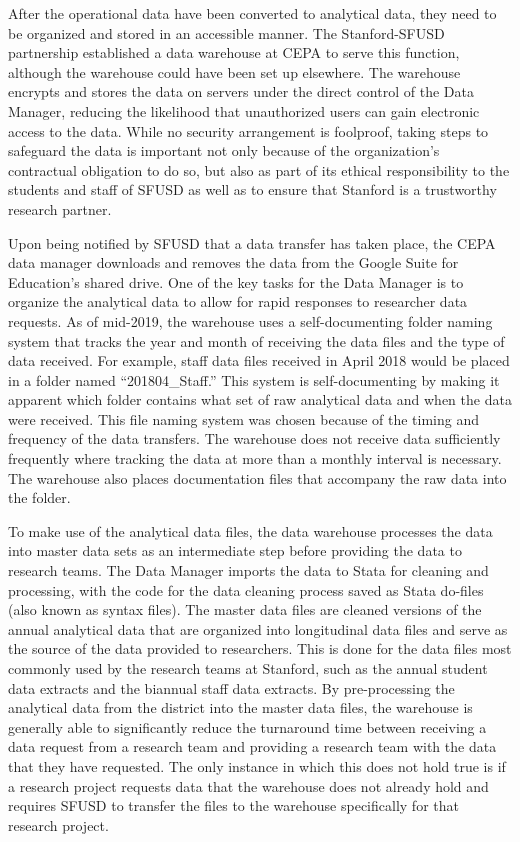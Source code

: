 After the operational data have been converted to analytical data, they need to be organized and stored in an accessible manner. The Stanford-SFUSD partnership established a data warehouse at CEPA to serve this function, although the warehouse could have been set up elsewhere. The warehouse encrypts and stores the data on servers under the direct control of the Data Manager, reducing the likelihood that unauthorized users can gain electronic access to the data. While no security arrangement is foolproof, taking steps to safeguard the data is important not only because of the organization's contractual obligation to do so, but also as part of its ethical responsibility to the students and staff of SFUSD as well as to ensure that Stanford is a trustworthy research partner.

Upon being notified by SFUSD that a data transfer has taken place, the CEPA data manager downloads and removes the data from the Google Suite for Education's shared drive. One of the key tasks for the Data Manager is to organize the analytical data to allow for rapid responses to researcher data requests. As of mid-2019, the warehouse uses a self-documenting folder naming system that tracks the year and month of receiving the data files and the type of data received. For example, staff data files received in April 2018 would be placed in a folder named ``201804\_Staff.'' This system is self-documenting by making it apparent which folder contains what set of raw analytical data and when the data were received. This file naming system was chosen because of the timing and frequency of the data transfers. The warehouse does not receive data sufficiently frequently where tracking the data at more than a monthly interval is necessary. The warehouse also places documentation files that accompany the raw data into the folder.

To make use of the analytical data files, the data warehouse processes the data into master data sets as an intermediate step before providing the data to research teams. The Data Manager imports the data to Stata for cleaning and processing, with the code for the data cleaning process saved as Stata do-files (also known as syntax files). The master data files are cleaned versions of the annual analytical data that are organized into longitudinal data files and serve as the source of the data provided to researchers. This is done for the data files most commonly used by the research teams at Stanford, such as the annual student data extracts and the biannual staff data extracts. By pre-processing the analytical data from the district into the master data files, the warehouse is generally able to significantly reduce the turnaround time between receiving a data request from a research team and providing a research team with the data that they have requested. The only instance in which this does not hold true is if a research project requests data that the warehouse does not already hold and requires SFUSD to transfer the files to the warehouse specifically for that research project.

